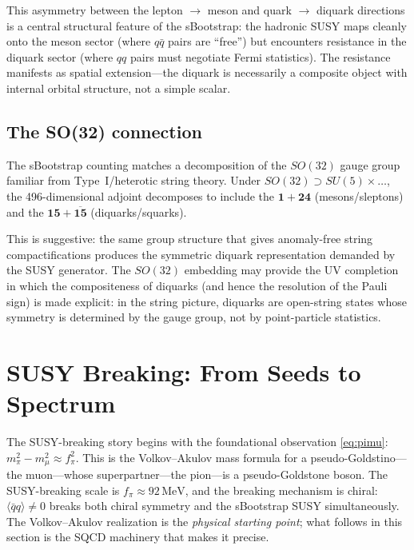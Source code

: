 \documentclass[12pt,a4paper]{article}
\newcommand{\MeV}{\,\text{MeV}}
\newcommand{\qqbar}{\langle\bar{q}q\rangle}
\begin{document}
This asymmetry between the lepton $\to$ meson and quark $\to$ 
diquark directions is a central structural feature of the 
sBootstrap: the hadronic SUSY maps cleanly onto the meson sector 
(where $q\bar{q}$ pairs are ``free'') but encounters resistance 
in the diquark sector (where $qq$ pairs must negotiate Fermi 
statistics). The resistance manifests as spatial extension---the 
diquark is necessarily a composite object with internal orbital 
structure, not a simple scalar.

\subsection{The SO(32) connection}

The sBootstrap counting matches a decomposition of the $SO(32)$ gauge 
group familiar from Type~I/heterotic string theory. Under 
$SO(32) \supset SU(5) \times \ldots$, the 496-dimensional adjoint 
decomposes to include the 
$\mathbf{1} + \mathbf{24}$ (mesons/sleptons) and the 
$\mathbf{15} + \overline{\mathbf{15}}$ (diquarks/squarks).

This is suggestive: the same group structure that gives anomaly-free 
string compactifications produces the symmetric diquark 
representation demanded by the SUSY generator. The $SO(32)$ embedding 
may provide the UV completion in which the compositeness of diquarks 
(and hence the resolution of the Pauli sign) is made explicit: in 
the string picture, diquarks are open-string states whose symmetry 
is determined by the gauge group, not by point-particle statistics.

\section{SUSY Breaking: From Seeds to Spectrum}
\label{sec:breaking}

The SUSY-breaking story begins with the foundational observation 
\eqref{eq:pimu}: $m_\pi^2 - m_\mu^2 \approx f_\pi^2$. This is the 
Volkov--Akulov mass formula for a pseudo-Goldstino---the muon---whose 
superpartner---the pion---is a pseudo-Goldstone boson. The SUSY-breaking 
scale is $f_\pi \approx 92\MeV$, and the breaking mechanism is chiral: 
$\qqbar \neq 0$ breaks both chiral symmetry and the sBootstrap SUSY 
simultaneously. The Volkov--Akulov realization is the \emph{physical 
starting point}; what follows in this section is the SQCD machinery 
that makes it precise.
\end{document}
